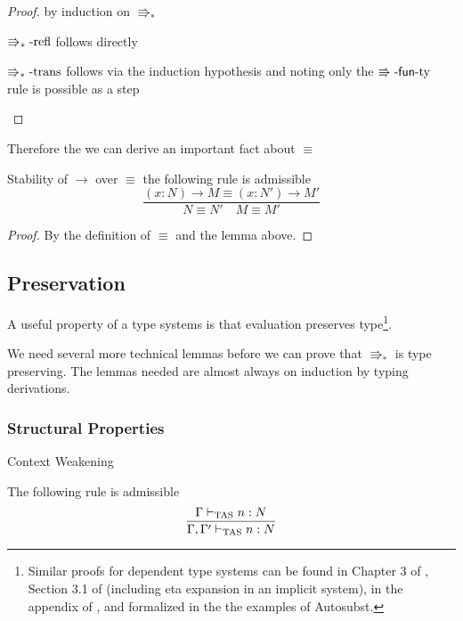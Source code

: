 \begin{proof}
by induction on $\Rrightarrow_{\ast}$
\begin{casenv}
  \item $\operatorname{\Rrightarrow_{\ast}-refl}$ follows directly
  \item $\operatorname{\Rrightarrow_{\ast}-trans}$ follows via the induction hypothesis and noting only the $\operatorname{\Rrightarrow-\mathsf{fun}-ty}$ rule is possible as a step
\end{casenv}
\end{proof}
Therefore the we can derive an important fact about $\equiv$
\begin{cor}
Stability of $\rightarrow$ over $\equiv$
the following rule is admissible
\[
\frac{\left(x:N\right)\rightarrow M\equiv\left(x:N'\right)\rightarrow M'}{N\equiv N'\quad M\equiv M'}
\]
\end{cor}

\begin{proof}
By the definition of $\equiv$ and the lemma above.
\end{proof}

\subsection{Preservation}

A useful property of a type systems is that evaluation preserves type\footnote{
   Similar proofs for dependent type systems can be found in Chapter 3 of \cite{luo1994computation}, Section 3.1 of \cite{10.1007/3-540-45413-6_27}(including eta expansion in an implicit system), in the appendix of \cite{sjoberg2012irrelevance}, and formalized in the the examples of Autosubst\cite{SchaeferEtAl:2015:Autosubst:-Reasoning}.
   }.

We need several more technical lemmas before we can prove that $\Rrightarrow_{\ast}$ is type preserving.
The lemmas needed are almost always on induction by typing derivations.

\subsubsection{Structural Properties}

\begin{thm}
Context Weakening

The following rule is admissible
\[
\frac{\Gamma\vdash_{\mathrm{TAS}} n:N}{\Gamma,\Gamma'\vdash_{\mathrm{TAS}} n:N}
\]
\end{thm}

